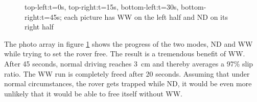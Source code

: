 \documentclass[a4paper,twocolumn]{esapub2005} %
\begin{document}
\begin{figure}[h!]
    \centering	
        \caption{top-left:t=0s,  top-right:t=15s, bottom-left:t=30s,
        bottom-right:t=45s; each picture has WW on the left half and
        ND on its right half }
    \label{fig:volleysequence}
\end{figure}

The photo array in figure \ref{fig:volleysequence} shows the progress of the
two modes, ND and WW while trying to set the rover free.
The result is a tremendous benefit of WW. After 45 seconds, normal
driving reaches 3~\unit{cm} and thereby averages a 97\% slip ratio. The WW
run is completely freed after 20 seconds. Assuming that under normal
circumstances, the rover gets trapped while ND, it would be even
more unlikely that it would be able to free itself without WW.
\end{document}
